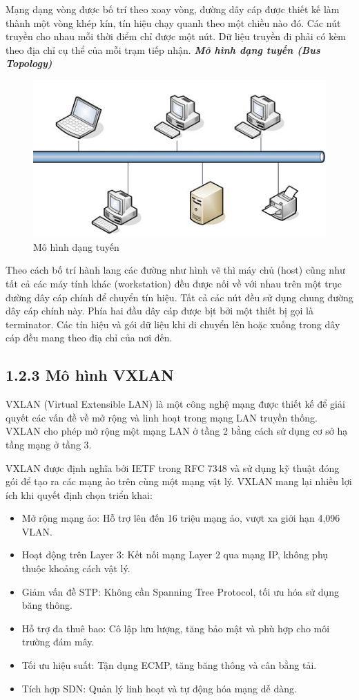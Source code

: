 Mạng dạng vòng được bố trí theo xoay vòng, đường dây cáp được thiết kế làm thành một vòng khép kín, tín hiệu chạy quanh theo một chiều nào đó. Các nút truyền cho nhau mỗi thời điểm chỉ được một nút. Dữ liệu truyền đi phải có kèm theo địa chỉ cụ thể của mỗi trạm tiếp nhận.
\newpage
\textbf{\textit{Mô hình dạng tuyến (Bus Topology)}}

\begin{figure}[htbp]
    \centering
    \includegraphics[width=0.5\linewidth]{img/bus-topology.jpeg}
    \caption{Mô hình dạng tuyến}
\end{figure}

Theo cách bố trí hành lang các đường như hình vẽ thì máy chủ (host) cũng như tất cả các máy tính khác (workstation) đều được nối về với nhau trên một trục đường dây cáp chính để chuyển tín hiệu. Tất cả các nút đều sử dụng chung đường dây cáp chính này. Phía hai đầu dây cáp được bịt bởi một thiết bị gọi là terminator. Các tín hiệu và gói dữ liệu khi di chuyển lên hoặc xuống trong dây cáp đều mang theo điạ chỉ của nơi đến.
\subsection*{1.2.3 Mô hình VXLAN}

VXLAN (Virtual Extensible LAN) là một công nghệ mạng được thiết kế để giải quyết các vấn đề về mở rộng và linh hoạt trong mạng LAN truyền thống. VXLAN cho phép mở rộng một mạng LAN ở tầng 2 bằng cách sử dụng cơ sở hạ tầng mạng ở tầng 3. 

VXLAN được định nghĩa bởi IETF trong RFC 7348 và sử dụng kỹ thuật đóng gói để tạo ra các mạng ảo trên cùng một mạng vật lý. VXLAN mang lại nhiều lợi ích khi quyết định chọn triển khai:

\begin{itemize}[left=2cm]
    \item Mở rộng mạng ảo: Hỗ trợ lên đến 16 triệu mạng ảo, vượt xa giới hạn 4,096 VLAN.
    \item Hoạt động trên Layer 3: Kết nối mạng Layer 2 qua mạng IP, không phụ thuộc khoảng cách vật lý.
    \item Giảm vấn đề STP: Không cần Spanning Tree Protocol, tối ưu hóa sử dụng băng thông.
    \item Hỗ trợ đa thuê bao: Cô lập lưu lượng, tăng bảo mật và phù hợp cho môi trường đám mây.
    \item Tối ưu hiệu suất: Tận dụng ECMP, tăng băng thông và cân bằng tải.
    \item Tích hợp SDN: Quản lý linh hoạt và tự động hóa mạng dễ dàng.
\end{itemize}


